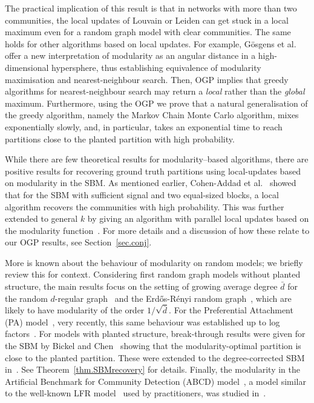 \documentclass[a4paper,UKenglish,cleveref, autoref, thm-restate,numberwithinsect]{lipics-v2021}
\newcommand{\Fc}{
}
\begin{document}
The practical implication of this result is that in networks with more than two communities, the local updates of Louvain or Leiden can get stuck in a local maximum even for a random graph model with clear communities. The same holds for other algorithms based on local updates. For example, G\"osgens et al.~\cite{gacksgens2023hyperspherical} offer a new interpretation of modularity as an angular distance in a high-dimensional hypersphere, thus establishing equivalence of modularity maximisation and nearest-neighbour search. Then, OGP implies that greedy algorithms for nearest-neighbour search may return a {\em local} rather than the {\em global} maximum. Furthermore, using the OGP we prove that a natural generalisation of the greedy algorithm, namely the Markov Chain Monte Carlo algorithm, mixes exponentially slowly, and, in particular, takes an exponential time to reach partitions close to the planted partition with high probability.


While there are few theoretical results for modularity--based algorithms, there are positive results for recovering ground truth partitions using local-updates based on modularity in the SBM. As mentioned earlier, Cohen-Addad et al.~\cite{cohen2020power} showed that for the SBM with sufficient signal and two equal-sized blocks, a local algorithm recovers the communities with high probability. This was further extended to general $k$ by giving  an algorithm with parallel local updates based on the modularity function~\cite{cohen2022massively}. For more details and a {\Fc discussion of how these relate to our OGP results}, see Section~\ref{sec.conj}.

More is known about the behaviour of modularity on random models; we briefly review this for context.
Considering first random graph models without planted structure, the main results focus on the setting of growing average degree $\bar{d}$ for the random $d$-regular graph~\cite{lichev2022modularity,mcdiarmid2018modularity,prokhorenkova2017modularity} and the Erd\H{o}s-R\'enyi random graph~\cite{mcdiarmid2020modularity,rybarczyk2025new}, which are likely to have modularity of the order $1/\sqrt{\bar{d}}$. For the Preferential Attachment (PA) model~\cite{barabasi1999emergence}, very recently, this same behaviour was established up to log factors~\cite{rybarczyk2025modularity}.
%
For models with planted structure, break-through results were given for the SBM by Bickel and Chen~\cite{bickel2009nonparametric} showing that the modularity-optimal partition is close to the planted partition. These were extended to the degree-corrected SBM in~\cite{zhao2012consistency}. See Theorem~\ref{thm.SBMrecovery} for details. Finally, the modularity in the Artificial Benchmark for Community Detection (ABCD) model~\cite{kaminski2021artificial}, a model similar to the well-known LFR model~\cite{lancichinetti2008benchmark} used by practitioners, was studied in~\cite{kaminski2022modularity}.
\end{document}
